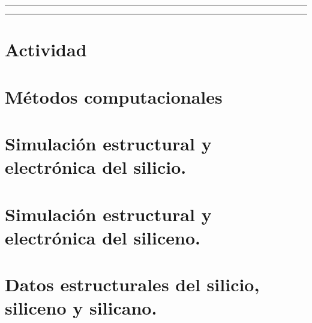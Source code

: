 








\tableofcontents			%
\newpage

\begin{center}
	\rule[0mm]{150mm}{0.1mm}		%
	\end{center}
	
	
\begin{abstract}		%
  
\end{abstract}
	
\begin{center}
	\rule[0mm]{150mm}{0.1mm}
	\end{center}

\section{Actividad}	
      
    
\section{Métodos computacionales}
    
                            
\section{Simulación estructural y electrónica del silicio.}	
      
    
\section{Simulación estructural y electrónica del siliceno.}	
         
    
\section{Datos estructurales del silicio, siliceno y silicano.}	
          

\newpage    

\nocite{*}


